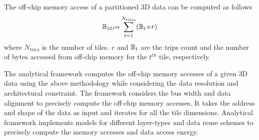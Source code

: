 The off-chip memory access of a partitioned 3D data can be computed as follows
\begin{align}\label{eq:BasicOffChip3DDataAccess}
	\mathbb{B}_{3D}{=}\sum_{t=1}^{N_{tiles}}(\mathbb{B}_{t}{\times}r)
\end{align}
where $N_{tiles}$ is the number of tiles. $r$ and $\mathbb{B}_{t}$ are the trips count and the number of bytes accessed from off-chip memory for the $t^{th}$ tile, respectively. 

The analytical framework computes the off-chip memory accesses of a given 3D data using the above methodology while considering the data resolution and architectural constraint. The framework considers the bus width and data alignment to precisely compute the off-chip memory accesses. It takes the
address and shape of the data as input and iterates for all the tile dimensions. Analytical framework implements models for different layer-types and data reuse schemes to precisely compute the memory accesses and data access energy. 

